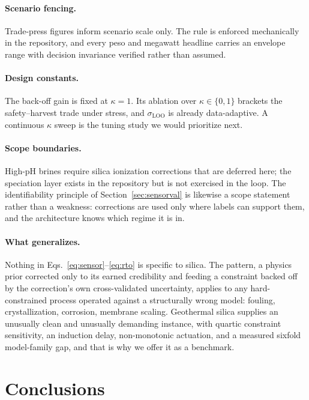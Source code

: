 \documentclass[review,number,sort&compress]{elsarticle}
\begin{document}
\paragraph{Scenario fencing.} Trade-press figures inform scenario scale
only. The rule is enforced mechanically in the repository, and every
peso and megawatt headline carries an envelope range with decision
invariance verified rather than assumed.

\paragraph{Design constants.} The back-off gain is fixed at
$\kappa = 1$. Its ablation over $\kappa \in \{0,1\}$ brackets the
safety--harvest trade under stress, and $\sigma_{\mathrm{LOO}}$ is
already data-adaptive. A continuous $\kappa$ sweep is the tuning study we
would prioritize next.

\paragraph{Scope boundaries.} High-pH brines require silica ionization
corrections that are deferred here; the speciation layer exists in the
repository but is not exercised in the loop. The identifiability
principle of Section~\ref{sec:sensorval} is likewise a scope statement
rather than a weakness: corrections are used only where labels can
support them, and the architecture knows which regime it is in.

\paragraph{What generalizes.} Nothing in
Eqs.~\eqref{eq:sensor}--\eqref{eq:rto} is specific to silica. The
pattern, a physics prior corrected only to its earned credibility and
feeding a constraint backed off by the correction's own cross-validated
uncertainty, applies to any hard-constrained process operated against a
structurally wrong model: fouling, crystallization, corrosion, membrane
scaling. Geothermal silica supplies an unusually clean and unusually
demanding instance, with quartic constraint sensitivity, an induction
delay, non-monotonic actuation, and a measured sixfold model-family
gap, and that is why we offer it as a benchmark.

\section{Conclusions}\label{sec:conclusions}
\end{document}
